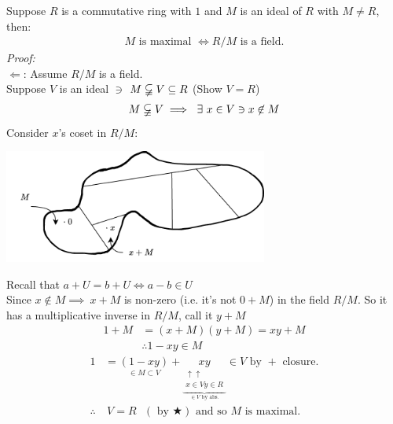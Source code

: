 \setcounter{dummy}{0}
\begin{theorem}
    Suppose $R$ is a commutative ring with $1$ and $M$ is an ideal of $R$ with $M\neq R$, then:
    \begin{align}
        M \text{ is maximal } \iff R/M \text{ is a field.} \nonumber
    \end{align}
    \textit{Proof: }\\
    $\Leftarrow$: Assume $R/M$ is a field. \\
    Suppose $V$ is an ideal $\ni$ $M\varsubsetneqq V \subseteq R$ (Show $V=R$)
    \begin{align}
        M \varsubsetneqq V \implies \ \exists \ x \in V \ni x\not \in M \nonumber
    \end{align}
    Consider $x$'s coset in $R/M$:
    \begin{center}
    \includegraphics[width=0.65\textwidth]{Figures/x_coset_in_R_M.png} \\ 
    \end{center}
    Recall that $a+U=b+U \iff a-b\in U$ \\
    Since $x\not \in M \implies \ x+M$ is non-zero (i.e. it's not $0+M$) in the field $R/M$. So it has a multiplicative inverse in $R/M$, call it $y+M$
    \begin{align}
        1+M &= (x+M)(y+M)=xy+M\nonumber \\
        &\therefore 1-xy \in M \nonumber
    \end{align}
    \begin{align}
        1&= \underset{\in M \subset V}{(1-xy)}+\underset{\underbrace{\substack{\uparrow\uparrow\\x \in V y\in R}}_{\in V \text{ by abs.}}}{xy} \in V \text{ by }+ \text{ closure.} \nonumber \\
        \therefore & \ V=R \ \ \ (\text{ by }\bigstar) \text{ and so } M \text{ is maximal.} \nonumber
    \end{align}


\end{theorem}
